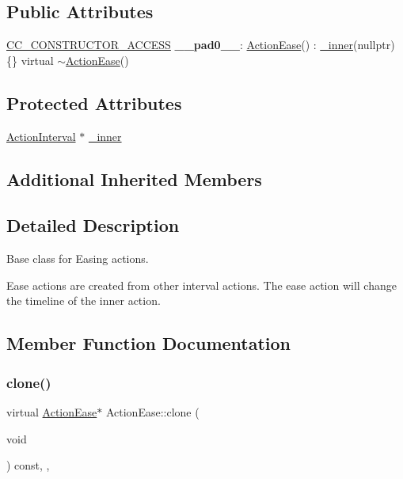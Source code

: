 \subsection*{Public Attributes}
\begin{DoxyCompactItemize}
\item 
\mbox{\label{classActionEase_ad8931612dad1bb5b1a06b6e669074c9e}} 
\hyperlink{_2cocos2d_2cocos_2base_2ccConfig_8h_a25ef1314f97c35a2ed3d029b0ead6da0}{C\+C\+\_\+\+C\+O\+N\+S\+T\+R\+U\+C\+T\+O\+R\+\_\+\+A\+C\+C\+E\+SS} {\bfseries \+\_\+\+\_\+pad0\+\_\+\+\_\+}\+: \hyperlink{classActionEase}{Action\+Ease}() \+: \hyperlink{classActionEase_ae8717262cdb409d9810e5f7ac2478b98}{\+\_\+inner}(nullptr) \{\} virtual $\sim$\hyperlink{classActionEase}{Action\+Ease}()
\end{DoxyCompactItemize}
\subsection*{Protected Attributes}
\begin{DoxyCompactItemize}
\item 
\hyperlink{classActionInterval}{Action\+Interval} $\ast$ \hyperlink{classActionEase_ae8717262cdb409d9810e5f7ac2478b98}{\+\_\+inner}
\end{DoxyCompactItemize}
\subsection*{Additional Inherited Members}


\subsection{Detailed Description}
Base class for Easing actions. 

Ease actions are created from other interval actions. The ease action will change the timeline of the inner action. 

\subsection{Member Function Documentation}
\mbox{\label{classActionEase_a39bec93fe161fb732a74d8e51a2fe08b}} 
\subsubsection{\texorpdfstring{clone()}{clone()}}
{\footnotesize\ttfamily virtual \hyperlink{classActionEase}{Action\+Ease}$\ast$ Action\+Ease\+::clone (\begin{DoxyParamCaption}\item[{void}]{ }\end{DoxyParamCaption}) const\hspace{0.3cm}{\ttfamily [inline]}, {\ttfamily [override]}, {\ttfamily [virtual]}}

